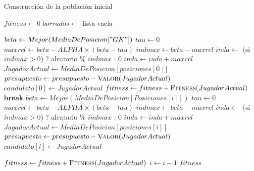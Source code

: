 \documentclass{article}
\begin{document}
\renewcommand{\thealgorithm}{}
\begin{algorithm}[H]
    \small
    \caption{Construcción de la población inicial}
    \begin{algorithmic}[1]
            \State $fitness \gets 0$
            \State $borrados \gets$ lista vacía
            
                \State $beta \gets Mejor(MediaDePosicion["GK"])$
                \State $tau \gets 0$
                \State $maxrcl \gets beta - ALPHA \times (beta - tau)$
                \State $indmax \gets beta - maxrcl$
                \State $inda \gets$ (si $indmax > 0$) ? aleatorio \% $indmax$ : $0$
                \State $inda \gets inda + maxrcl$
                \State $JugadorActual \gets MediaDePosicion[posiciones[0]]$
                    \State $presupuesto \gets presupuesto - \Call{Valor}{JugadorActual}$
                    \State $candidato[0] \gets JugadorActual$
                    \State $fitness \gets fitness + \Call{Fitness}{JugadorActual}$
                    \State \textbf{break}
                \EndIf
            \EndWhile
            \State
                \State $beta \gets Mejor(MediaDePosicion[Posiciones[i]])$
                \State $tau \gets 0$
                \State $maxrcl \gets beta - ALPHA \times (beta - tau)$
                \State $indmax \gets beta - maxrcl$
                \State $inda \gets$ (si $indmax > 0$) ? aleatorio \% $indmax$ : $0$
                \State $inda \gets inda + maxrcl$
                \State $JugadorActual \gets MediaDePosicion[posiciones[i]]$
                    \State $presupuesto \gets presupuesto - \Call{Valor}{JugadorActual}$
                    \State $candidato[i] \gets JugadorActual$

                    \State $fitness \gets fitness + \Call{Fitness}{JugadorActual}$
                \Else
                    \State $i \gets i - 1$ 
                \EndIf
                \State {}
            \EndFor
            \State \Return $fitness$
        \EndProcedure
    \end{algorithmic}
\end{algorithm}
\end{document}
